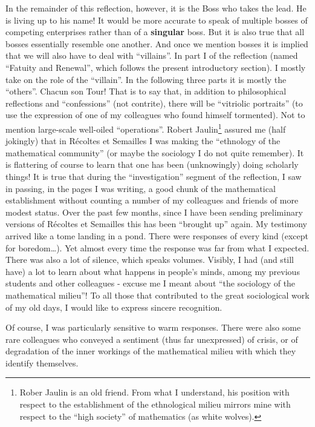 In the remainder of this reflection, however, it is the Boss who takes the lead. 
He is living up to his name! It would be more accurate 
to speak of multiple bosses of competing enterprises rather than of a \textbf{singular}
boss.
But it is also true that all bosses essentially resemble one another.
And once we mention bosses it is implied that we will also have to deal with ``villains''.
In part I of the reflection (named ``Fatuity and Renewal'', which follows the present
introductory section). I mostly take on the role of the ``villain''. In the following
three parts it is mostly the ``others''. 
Chacun son Tour!
That is to say that, in addition to philosophical reflections and ``confessions''
(not contrite), there will be ``vitriolic portraits'' (to use the expression of one of my
colleagues who found himself tormented). 
Not to mention large-scale well-oiled ``operations''.
Robert Jaulin\footnote{Rober Jaulin is an old friend. From what I understand, his position
with respect to the establishment of the ethnological milieu mirrors mine with respect to
the ``high society'' of mathematics (as white wolves).} assured me (half jokingly) that in 
R\'ecoltes et Semailles I was making the ``ethnology
of the mathematical community'' (or maybe the sociology I do not quite remember).
It is flattering of course to learn
that one has been (unknowingly) doing scholarly things!
It is true that during the ``investigation'' segment of the reflection, I saw in passing,
in the pages I was writing, a good chunk of the mathematical establishment
without counting a number of my colleagues and friends of more modest status.
Over the past few months, since I have been sending preliminary versions of
R\'ecoltes et Semailles 
this has been ``brought up'' again. My testimony arrived like a tome landing in a pond. 
There were responses of every kind (except for boredom\ldots). 
Yet almost every time the response was far from what I expected. 
There was also a lot of silence, which speaks volumes. 
Visibly, I had (and still have) a lot to learn about what happens in people's minds, among
my previous students and other colleagues - excuse me I meant about ``the sociology of the
mathematical milieu''!
To all those that contributed to the great sociological work of my old days, I would like
to express sincere recognition.

Of course, I was particularly sensitive to warm responses. There were also some rare
colleagues who conveyed a sentiment (thus far unexpressed) of crisis, or of 
degradation of
the inner workings of the mathematical milieu with which they identify themselves. 

